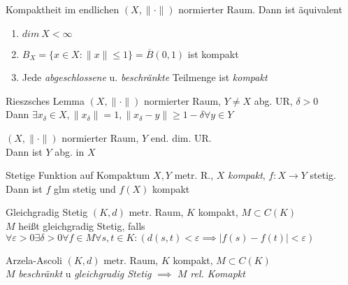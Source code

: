 \begin{satz}{Kompaktheit im endlichen}
  $(X, \|\cdot\|)$ normierter Raum. Dann ist äquivalent
  \begin{enumerate}[label = (\roman*)]
    \item $dim\ X < \infty$
    \item $B_X = \{x\in X: \|x\| \leq 1\} = \overline{B}(0,1)$ ist kompakt
    \item Jede \textit{abgeschlossene} u. \textit{beschränkte} Teilmenge ist
      \textit{kompakt}
  \end{enumerate}
\end{satz}

\begin{satz}{Rieszsches Lemma}
  $(X, \|\cdot\|)$ normierter Raum, $Y \neq X$ abg. UR, $\delta>0$\\
  Dann $\exists x_{\delta} \in X, \|x_{\delta}\| = 1,  \|x_{\delta}-y\|
  \geq 1-\delta \forall y \in Y$
\end{satz}

\begin{lemma}
  $(X, \|\cdot\|)$ normierter Raum, $Y$ end. dim. UR.\\
  Dann ist $Y$ abg. in $X$
\end{lemma}

\begin{satz}{Stetige Funktion auf Kompaktum}
  $X,Y$ metr. R., $X$ \textit{kompakt}, $f:X\to Y$ stetig.\\
  Dann ist $f$ glm stetig und $f(X)$ kompakt
\end{satz}

\begin{definition}{Gleichgradig Stetig}
  $(K,d)$ metr. Raum, $K$ kompakt, $M \subset C(K)$\\
  $M$ heißt gleichgradig Stetig, falls
  $\forall \varepsilon >0 \exists \delta >0 \forall f \in M \forall s,t \in K:
  (d(s,t) < \varepsilon \implies |f(s) - f(t)| < \varepsilon)$
\end{definition}

\begin{satz}{Arzela-Ascoli}
  $(K,d)$ metr. Raum, $K$ kompakt, $M \subset C(K)$\\
  $M$ \textit{beschränkt} u \textit{gleichgradig Stetig} $\implies$ $M$
  \textit{rel. Komapkt}
\end{satz}
